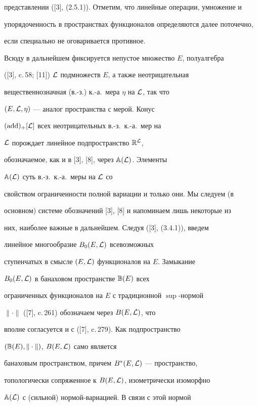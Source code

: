 представлении ([3], (2.5.1)). Отметим, что линейные операции, умножение и


упорядоченность в пространствах функционалов определяются далее поточечно,


если специально не оговаривается противное.





Всюду в дальнейшем фиксируется непустое множество $E$, полуалгебра


([3], c.\,58; [11]) $\cal L$ подмножеств $E$, а также неотрицательная


вещественнозначная (в.-з.) к.-а.~мера $\eta$ на $\cal L$, так что


$(E,\cal L,\eta)$ --- аналог пространства с мерой. Конус


$(\operatorname{add})_+[\cal L]$ всех неотрицательных в.-з.~к.-а.~мер на


$\cal L$ порождает линейное подпространство $\Bbb R^{\cal L}$,


обозначаемое, как и в [3], [8], через $\Bbb A(\cal L)$. Элементы


$\Bbb A(\cal L)$ суть в.-з.~к.-а.~меры на $\cal L$ со


свойством ограниченности полной вариации и только они. Мы следуем (в


основном) системе обозначений [3], [8] и напоминаем лишь некоторые из


них, наиболее важные в дальнейшем. Следуя ([3], (3.4.1)), введем


линейное многообразие $B_0(E,\cal L)$ всевозможных


ступенчатых в смысле $(E,\cal L)$ функционалов на $E$. Замыкание


$B_0(E,\cal L)$ в банаховом пространстве $\Bbb B(E)$ всех


ограниченных функционалов на $E$ с традиционной $\sup$-нормой


$\|\cdot\|$ ([7], c.\,261) обозначаем через $B(E,\cal L)$, что


вполне согласуется и с ([7], c.\,279). Как подпространство


$(\Bbb B(E),\|\cdot\|)$, $B(E,\cal L)$ само является


банаховым пространством, причем $B^*(E,\cal L)$ --- пространство,


топологически сопряженное к $B(E,\cal L)$, изометрически изоморфно


$\Bbb A(\cal L)$ с (сильной) нормой-вариацией. В связи с этой нормой


